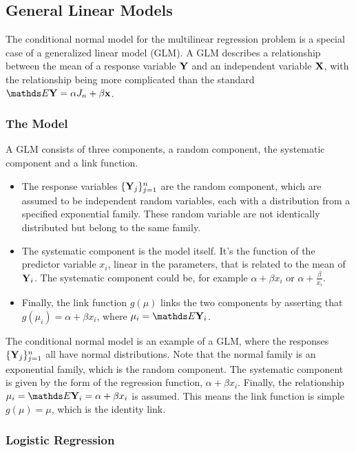 \documentclass{homework}
\begin{document}
\subsection{General Linear Models}

The conditional normal model for the multilinear regression problem is a special case of a generalized linear model (GLM). A GLM describes a relationship 
between the mean of a response variable ${\bf Y}$ and an independent variable ${\bf X}$, with the relationship being more complicated than the standard $\E \Y = \alpha J_n + \beta {\bf x}$. \\

\subsubsection{The Model}

A GLM consists of three components, a random component, the systematic component and a link function. 

\begin{itemize}
    \item The response variables $\{{\bf Y}_j\}_{j=1}^{n}$ are the random component, which are assumed to be independent random variables, each with a distribution from a specified exponential family. These random variable are not identically distributed but belong to the same family. 
    \item The systematic component is the model itself. It's the function of the predictor variable $x_i$, linear in the parameters, that is related to the mean of ${\bf Y}_i$. The systematic component could be, for example $\alpha + \beta x_i$ or $\alpha + \frac{\beta}{x_i}$. 
    \item Finally, the link function $g(\mu)$ links the two components by asserting that $g(\mu_i) = \alpha + \beta x_i$, where $\mu_i = \E \Y_i$. 
\end{itemize}

The conditional normal model is an example of a GLM, where the responses $\{{\bf Y}_j\}_{j=1}^{n}$ all have normal distributions. Note that the normal family is an exponential family, which is the random component. The systematic component is given by the form of the regression function, $\alpha + \beta x_i$. Finally, the relationship $\mu_i = \E \Y_i = \alpha + \beta x_i$ is assumed. This means the link function is simple $g(\mu) = \mu$, which is the identity link. \\

\subsubsection{Logistic Regression}
\end{document}
